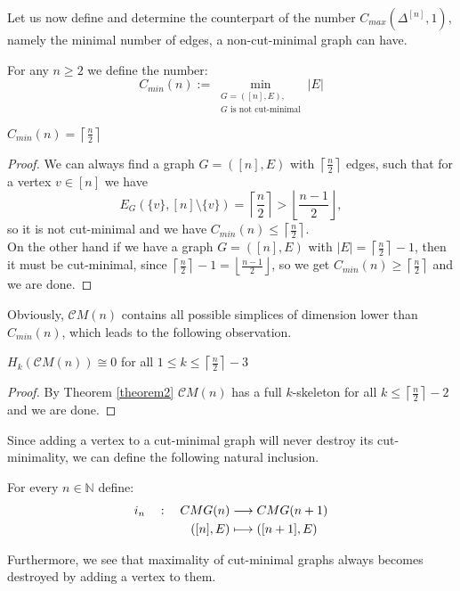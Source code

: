Let us now define and determine the counterpart of the number \(C_{max}(\Delta^{[n]},1)\), namely the minimal number of  edges, a non-cut-minimal graph can have.
\begin{defi}
For any \(n\geq 2\) we define the number:
\[
C_{min}(n):=\min\limits_{\substack{G=([n],E),\\G\text{ is not cut-minimal}}}|E|
\]
\end{defi}
\begin{thm}\label{theorem2}
\(C_{min}(n)=\left\lceil\frac{n}{2}\right\rceil\)
\begin{proof}
We can always find a graph \(G=([n],E)\) with \(\left\lceil\frac{n}{2}\right\rceil\) edges, such that for a vertex \(v\in [n]\) we have
\[
E_G(\{v\},[n]\setminus\{v\})=\left\lceil\frac{n}{2}\right\rceil>\left\lfloor\frac{n-1}{2}\right\rfloor,
\]
so it is not cut-minimal and we have \(C_{min}(n)\leq\left\lceil\frac{n}{2}\right\rceil\).\\
On the other hand if we have a graph \(G=([n],E)\) with \(|E|=\left\lceil\frac{n}{2}\right\rceil-1\), then it must be cut-minimal, since \(\left\lceil\frac{n}{2}\right\rceil-1=\left\lfloor\frac{n-1}{2}\right\rfloor\), so we get \(C_{min}(n)\geq\left\lceil\frac{n}{2}\right\rceil\) and we are done.
\end{proof}
\end{thm}
Obviously, \(\mathcal{C}M(n)\) contains all possible simplices of dimension lower than \(C_{min}(n)\), which leads to the following observation.
\begin{cor}
\(H_k(\mathcal{C}M(n))\cong 0\) for all \(1\leq k\leq\left\lceil\frac{n}{2}\right\rceil-3\)
\begin{proof}
By Theorem \ref{theorem2} \(\mathcal{C}M(n)\) has a full \(k\)-skeleton for all \(k\leq\left\lceil\frac{n}{2}\right\rceil-2\) and we are done. 
\end{proof}
\end{cor}
Since adding a vertex to a cut-minimal graph will never destroy its cut-minimality, we can define the following natural inclusion.
\begin{defi}
For every \(n\in\mathbb{N}\) define:
\begin{align}
i_n\quad :\quad CMG(n)&\longrightarrow CMG(n+1)\notag \\
([n],E)&\longmapsto ([n+1],E)\notag
\end{align}
\end{defi}
Furthermore, we see that maximality of cut-minimal graphs always becomes destroyed by adding a vertex to them.
